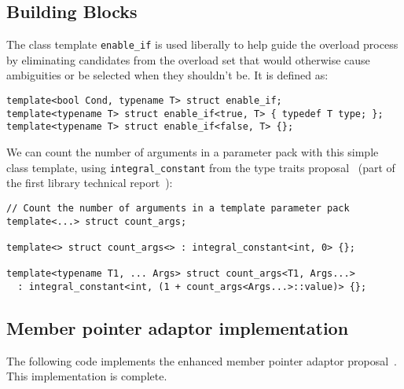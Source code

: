 \documentclass{article}
\begin{document}
\subsection{Building Blocks}
\label{building_blocks}
The class template {\tt enable\_if} is used liberally to help guide
the overload process by eliminating candidates from the overload set
that would otherwise cause ambiguities or be selected when they
shouldn't be. It is defined as:

\small
\begin{verbatim}
template<bool Cond, typename T> struct enable_if;
template<typename T> struct enable_if<true, T> { typedef T type; };
template<typename T> struct enable_if<false, T> {};
\end{verbatim}
\normalsize

We can count the number of arguments in a parameter pack with this
simple class template, using {\tt integral\_constant} from the type
traits proposal~\cite{Maddock03} (part of the first library technical
report~\cite{Austern03}):

\small
\begin{verbatim}
// Count the number of arguments in a template parameter pack
template<...> struct count_args;

template<> struct count_args<> : integral_constant<int, 0> {};

template<typename T1, ... Args> struct count_args<T1, Args...>
  : integral_constant<int, (1 + count_args<Args...>::value)> {};
\end{verbatim}
\normalsize

\subsection{Member pointer adaptor implementation}
\label{mem_fnimpl}
The following code implements the enhanced member pointer adaptor
proposal~\cite{Dimov03a}. This implementation is complete.
\end{document}
